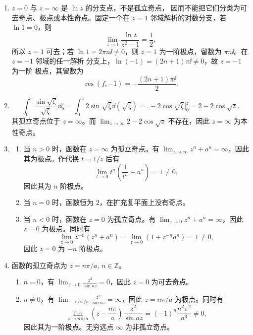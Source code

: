 \begin{question}
\begin{solution}
\begin{enumerate}
\begin{enumerate}
   无穷远点 \(\infty\) 为非孤立奇点。

   \end{enumerate}
  \item \(z=0\) 与 \(z=\infty\) 是 \(\ln z\) 的分支点，不是孤立奇点，
  因而不能把它们分类为可去奇点、极点或本性奇点。固定一个在
  \(z=1\) 邻域解析的对数分支，若 \(\ln1=0\)，则
  \[
  \lim_{z\to1}\frac{\ln z}{z^2-1}=\frac12,
  \]
  所以 \(z=1\) 可去；若 \(\ln1=2\pi n\ii\ne0\)，则 \(z=1\)
  为一阶极点，留数为 \(\pi n\ii\)。在 \(z=-1\) 邻域的任一解析
  分支上，\(\ln(-1)=(2n+1)\pi\ii\ne0\)，故 \(z=-1\) 为一阶
  极点，其留数为
  \[
  \operatorname{res}(f,-1)
  =-\frac{(2n+1)\pi\ii}{2}.
  \]
  \item \[
\int_0^z \frac{\sin\sqrt{\zeta}}{\sqrt{\zeta}}\dd{\zeta}
 = \int_0^z 2\sin\sqrt{\zeta}\dd(\sqrt{\zeta})
= \bigl.-2\cos\sqrt{\zeta}\bigr|_0^z
= 2 - 2\cos\sqrt{z}.
\]
其孤立奇点位于 \(z=\infty\)。而 \(\displaystyle\lim_{z\to\infty} 2 - 2\cos\sqrt{z}\) 不存在，因此 \(z=\infty\) 为本性奇点。

  \item 
  \begin{enumerate}
    \item 当 \(n>0\) 时，函数在 \(z=\infty\) 为孤立奇点。有 \(\displaystyle\lim_{z\to\infty} z^n + a^n = \infty\)，因此其为极点。作代换 \(t=1/z\) 后有
   \[
   \lim_{t\to 0} t^n \left(\frac{1}{t^n} + a^n\right) = 1 \neq 0,
   \]
   因此其为 \(n\) 阶极点。
    \item 当 \(n=0\) 时，函数恒为 \(2\)，在扩充复平面上没有奇点。
     \item 当 \(n<0\) 时，函数在 \(z=0\) 为孤立奇点。有 \(\displaystyle\lim_{z\to 0} z^n + a^n = \infty\)，因此 \(z=0\) 为极点。同时有
   \[
   \lim_{z\to 0} z^{-n} (z^n + a^n) = \lim_{z\to 0} (1 + z^{-n}a^n) = 1 \neq 0,
   \]
   因此 \(z=0\) 为 \(-n\) 阶极点。

  \end{enumerate}
  \item 函数的孤立奇点为 \(z=n\pi/a,\,n\in\mathbb{Z}\)。
   \begin{enumerate}
     \item \(n = 0\)，有 \(\displaystyle\lim_{z\to 0} \frac{z^2}{\sin a z} = 0\)，因此 \(z=0\) 为可去奇点。
     \item \(n \neq 0\)，有 \(\displaystyle\lim_{z\to n\pi/a} \frac{z^2}{\sin a z} = \infty\)，因此 \(z=n\pi/a\) 为极点。同时有
   \[
   \lim_{z\to n\pi/a} \left(z - \frac{n\pi}{a}\right) \frac{z^2}{\sin a z}
   =(-1)^n\frac{n^2\pi^2}{a^3}\neq0,
   \]
   因此其为一阶极点。无穷远点 \(\infty\) 为非孤立奇点。
   \end{enumerate}
\end{enumerate}
\end{solution}
\end{question}
